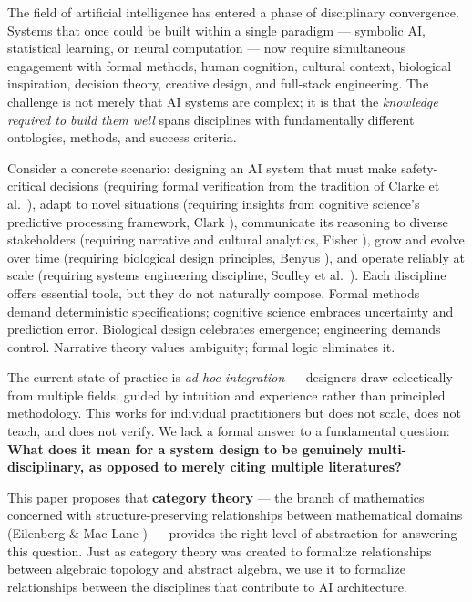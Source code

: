 \documentclass[11pt,a4paper]{article}
\begin{document}
The field of artificial intelligence has entered a phase of disciplinary convergence. Systems that once could be built within a single paradigm --- symbolic AI, statistical learning, or neural computation --- now require simultaneous engagement with formal methods, human cognition, cultural context, biological inspiration, decision theory, creative design, and full-stack engineering. The challenge is not merely that AI systems are complex; it is that the \emph{knowledge required to build them well} spans disciplines with fundamentally different ontologies, methods, and success criteria.

Consider a concrete scenario: designing an AI system that must make safety-critical decisions (requiring formal verification from the tradition of Clarke et al.\ \cite{clarke1999}), adapt to novel situations (requiring insights from cognitive science's predictive processing framework, Clark \cite{clark2013}), communicate its reasoning to diverse stakeholders (requiring narrative and cultural analytics, Fisher \cite{fisher1984}), grow and evolve over time (requiring biological design principles, Benyus \cite{benyus1997}), and operate reliably at scale (requiring systems engineering discipline, Sculley et al.\ \cite{sculley2015}). Each discipline offers essential tools, but they do not naturally compose. Formal methods demand deterministic specifications; cognitive science embraces uncertainty and prediction error. Biological design celebrates emergence; engineering demands control. Narrative theory values ambiguity; formal logic eliminates it.

The current state of practice is \emph{ad hoc integration} --- designers draw eclectically from multiple fields, guided by intuition and experience rather than principled methodology. This works for individual practitioners but does not scale, does not teach, and does not verify. We lack a formal answer to a fundamental question: \textbf{What does it mean for a system design to be genuinely multi-disciplinary, as opposed to merely citing multiple literatures?}

This paper proposes that \textbf{category theory} --- the branch of mathematics concerned with structure-preserving relationships between mathematical domains (Eilenberg \& Mac Lane \cite{eilenberg1945}) --- provides the right level of abstraction for answering this question. Just as category theory was created to formalize relationships between algebraic topology and abstract algebra, we use it to formalize relationships between the disciplines that contribute to AI architecture.
\end{document}
